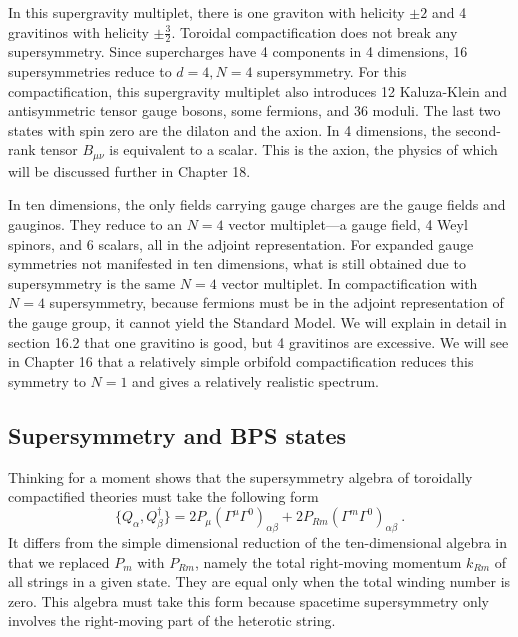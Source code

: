 In this supergravity multiplet, there is one graviton with helicity $\pm2$ and 4 gravitinos with helicity $\pm\frac{3}{2}$. Toroidal compactification does not break any supersymmetry. Since supercharges have 4 components in 4 dimensions, 16 supersymmetries reduce to $d=4, N=4$ supersymmetry. For this compactification, this supergravity multiplet also introduces 12 Kaluza-Klein and antisymmetric tensor gauge bosons, some fermions, and 36 moduli. The last two states with spin zero are the dilaton and the axion. In 4 dimensions, the second-rank tensor $B_{\mu\nu}$ is equivalent to a scalar. This is the axion, the physics of which will be discussed further in Chapter 18.

In ten dimensions, the only fields carrying gauge charges are the gauge fields and gauginos. They reduce to an $N=4$ vector multiplet—a gauge field, 4 Weyl spinors, and 6 scalars, all in the adjoint representation. For expanded gauge symmetries not manifested in ten dimensions, what is still obtained due to supersymmetry is the same $N=4$ vector multiplet. In compactification with $N=4$ supersymmetry, because fermions must be in the adjoint representation of the gauge group, it cannot yield the Standard Model. We will explain in detail in section 16.2 that one gravitino is good, but 4 gravitinos are excessive. We will see in Chapter 16 that a relatively simple orbifold compactification reduces this symmetry to $N=1$ and gives a relatively realistic spectrum.

\subsection*{Supersymmetry and BPS states}

Thinking for a moment shows that the supersymmetry algebra of toroidally compactified theories must take the following form
\begin{equation}
	\{Q_{\alpha},Q^{\dag}_{\beta}\} = 2P_{\mu}(\Gamma^{\mu}\Gamma^{0})_{\alpha\beta} +2P_{Rm}(\Gamma^{m}\Gamma^{0})_{\alpha\beta} \:. \label{11.6.23}
\end{equation}
It differs from the simple dimensional reduction of the ten-dimensional algebra in that we replaced $P_{m}$ with $P_{Rm}$, namely the total right-moving momentum $k_{Rm}$ of all strings in a given state. They are equal only when the total winding number is zero. This algebra must take this form because spacetime supersymmetry only involves the right-moving part of the heterotic string.

